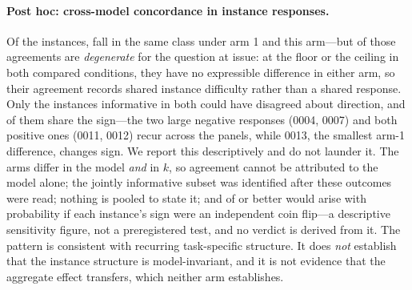 \documentclass{article}
\begin{document}
\paragraph{Post hoc: cross-model concordance in instance responses.} Of the \StatXModelTotal{} instances, \StatXModelSame{} fall in the same class under arm 1 and this arm---but \StatXModelDegenerate{} of those agreements are \emph{degenerate} for the question at issue: at the floor or the ceiling in both compared conditions, they have no expressible difference in either arm, so their agreement records shared instance difficulty rather than a shared response. Only the \StatXModelSignOf{} instances informative in both could have disagreed about direction, and \StatXModelSignAgree{} of them share the sign---the two large negative responses (0004, 0007) and both positive ones (0011, 0012) recur across the panels, while 0013, the smallest arm-1 difference, changes sign. We report this descriptively and do not launder it. The arms differ in the model \emph{and} in $k$, so agreement cannot be attributed to the model alone; the jointly informative subset was identified after these outcomes were read; nothing is pooled to state it; and \StatXModelSignAgree{} of \StatXModelSignOf{} or better would arise with probability \StatXModelSignExchP{} if each instance's sign were an independent coin flip---a descriptive sensitivity figure, not a preregistered test, and no verdict is derived from it. The pattern is consistent with recurring task-specific structure. It does \emph{not} establish that the instance structure is model-invariant, and it is not evidence that the aggregate effect transfers, which neither arm establishes.
\end{document}
